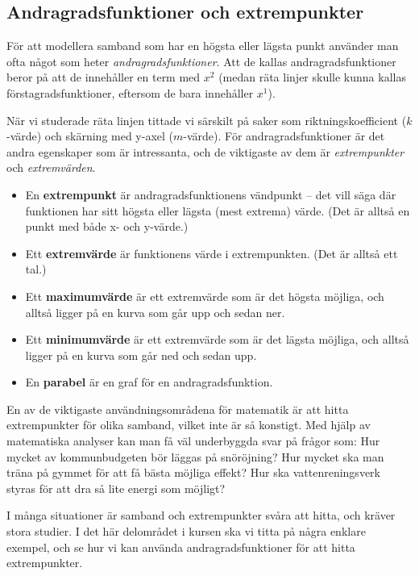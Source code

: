 \subsection {Andragradsfunktioner och extrempunkter}

För att modellera samband som har en högsta eller lägsta punkt använder man ofta något som heter \emph{andragradsfunktioner}.
Att de kallas andragradsfunktioner beror på att de innehåller en term med $x^2$ (medan räta linjer skulle kunna kallas förstagradsfunktioner, eftersom de bara innehåller $x^1$).

När vi studerade räta linjen tittade vi särskilt på saker som riktningskoefficient ($k$-värde) och skärning med y-axel ($m$-värde).
För andragradsfunktioner är det andra egenskaper som är intressanta, och de viktigaste av dem är \emph{extrempunkter} och \emph{extremvärden}.

\begin{itemize}
  \item En \textbf{extrempunkt} är andragradsfunktionens vändpunkt -- det vill säga där funktionen har sitt högsta eller lägsta (mest extrema) värde. (Det är alltså en punkt med både x- och y-värde.)
  \item Ett \textbf{extremvärde} är funktionens värde i extrempunkten. (Det är alltså ett tal.)
  \item Ett \textbf{maximumvärde} är ett extremvärde som är det högsta möjliga, och alltså ligger på en kurva som går upp och sedan ner.
  \item Ett \textbf{minimumvärde} är ett extremvärde som är det lägsta möjliga, och alltså ligger på en kurva som går ned och sedan upp.
  \item En \textbf{parabel} är en graf för en andragradsfunktion.
\end{itemize}

En av de viktigaste användningsområdena för matematik är att hitta extrempunkter för olika samband, vilket inte är så konstigt.
Med hjälp av matematiska analyser kan man få väl underbyggda svar på frågor som:
Hur mycket av kommunbudgeten bör läggas på snöröjning?
Hur mycket ska man träna på gymmet för att få bästa möjliga effekt?
Hur ska vattenreningsverk styras för att dra så lite energi som möjligt?

I många situationer är samband och extrempunkter svåra att hitta, och kräver stora studier.
I det här delområdet i kursen ska vi titta på några enklare exempel, och se hur vi kan använda andragradsfunktioner för att hitta extrempunkter.
